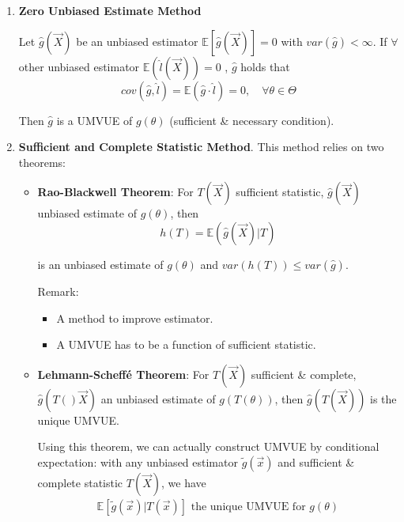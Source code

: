     \begin{enumerate}[topsep=2pt,itemsep=0pt]
    \item \textbf{Zero Unbiased Estimate Method}
                
        Let $\hat{g}(\vec{X})$ be an unbiased estimator $ \mathbb{E}\left[ \hat{g}(\vec{X}) \right] =0 $ with $var(\hat{g})<\infty$. If $\forall$ other unbiased estimator $\mathbb{E}(\hat{l}(\vec{X}))=0$ , $\hat{g}$ holds that
        \begin{equation}
            cov(\hat{g},\hat{l})=\mathbb{E}(\hat{g}\cdot\hat{l})=0,\quad\forall\theta\in\Theta    
        \end{equation}

        Then $\hat{g}$ is a UMVUE of $g(\theta)$ (sufficient \& necessary condition).
    \item \textbf{Sufficient and Complete Statistic Method}. This method relies on two theorems:
    \begin{itemize}[topsep=2pt,itemsep=0pt]
        \item \textbf{Rao-Blackwell Theorem}: For $T(\vec{X})$ sufficient statistic, $\hat{g}(\vec{X})$ unbiased estimate of $g(\theta)$, then 
        \begin{equation}
            h(T)=\mathbb{E}(\hat{g}(\vec{X})| T)    
        \end{equation}
    
            is an unbiased estimate of $g(\theta)$ and $var(h(T))\leq var(\hat{g})$.
    
            Remark:
            \begin{itemize}
                \item A method to improve estimator.
                \item A UMVUE has to be a function of sufficient statistic.
            \end{itemize}

        \item \textbf{Lehmann-Scheffé Theorem}: For $ T(\vec{X}) $ sufficient \& complete, $ \hat{g}(T()\vec{X}) $ an unbiased estimate of $ g(T(\theta )) $, then $ \hat{g}(T(\vec{X})) $ is the unique UMVUE.
        
        Using this theorem, we can actually construct UMVUE by conditional expectation: with any unbiased estimator $ \tilde{g}(\vec{x}) $ and sufficient \& complete statistic $ T(\vec{X}) $, we have
        \begin{align*}
             \mathbb{E}\left[ \tilde{g}(\vec{x})|T(\vec{x}) \right] \text{ the unique UMVUE for } g(\theta ) 
        \end{align*}
        

\end{itemize}
\end{enumerate}
